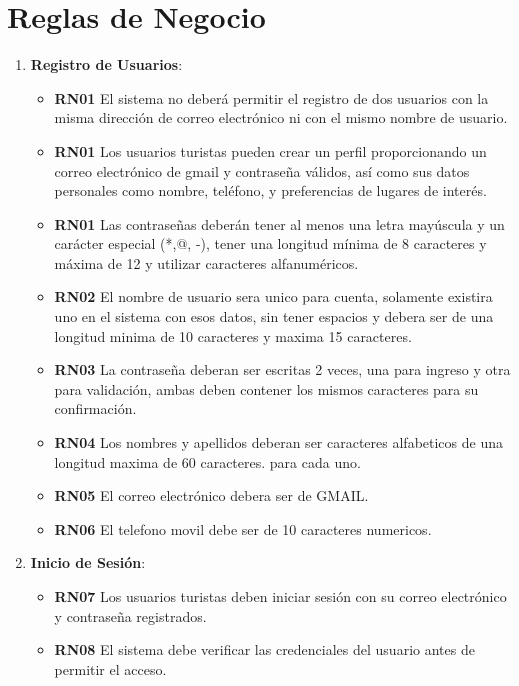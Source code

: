 \documentclass{article}
\begin{document}
\section{Reglas de Negocio}
\begin{enumerate}
    \item \textbf{Registro de Usuarios}:
    \begin{itemize}
        \item \textbf{RN01} El sistema no deberá permitir el registro de dos usuarios con la misma dirección de correo electrónico ni con el mismo nombre de usuario.
        \item \textbf{RN01} Los usuarios turistas pueden crear un perfil proporcionando un correo electrónico de gmail y contraseña válidos, así como sus datos personales como nombre, teléfono, y preferencias de lugares de interés.
        \item \textbf{RN01} Las contraseñas deberán tener al menos una letra mayúscula y un carácter especial (*,@, -), tener una longitud mínima de 8 caracteres y máxima de 12 y utilizar caracteres alfanuméricos.
        \item \textbf{RN02} El nombre de usuario sera unico para cuenta, solamente existira uno en el sistema con esos datos, sin tener espacios y debera ser de una longitud minima de 10 caracteres y maxima 15 caracteres.
        \item \textbf{RN03} La contraseña deberan ser escritas 2 veces, una para ingreso y otra para validación, ambas deben contener los mismos caracteres para su confirmación.
        \item \textbf{RN04} Los nombres y apellidos deberan ser caracteres alfabeticos de una longitud maxima de 60 caracteres. para cada uno.
        \item \textbf{RN05} El correo electrónico debera ser de GMAIL.
        \item \textbf{RN06} El telefono movil debe ser de 10 caracteres numericos.
        
    \end{itemize}

    
    \item \textbf{Inicio de Sesión}:
    \begin{itemize}
        \item \textbf{RN07} Los usuarios turistas deben iniciar sesión con su correo electrónico y contraseña registrados.
        \item \textbf{RN08} El sistema debe verificar las credenciales del usuario antes de permitir el acceso.
    \end{itemize}
    

\end{enumerate}
\end{document}

